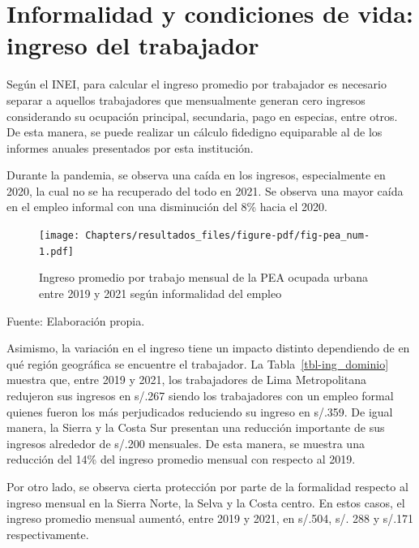 \documentclass[
  letterpaper,
  12pt,
  oneside,
  spanish,
  doublespacing,
  headsepline,
  parskip]{MastersDoctoralThesis}
\begin{document}
\hypertarget{informalidad-y-condiciones-de-vida-ingreso-del-trabajador}{%
\section{Informalidad y condiciones de vida: ingreso del
trabajador}\label{informalidad-y-condiciones-de-vida-ingreso-del-trabajador}}

Según el INEI, para calcular el ingreso promedio por trabajador es
necesario separar a aquellos trabajadores que mensualmente generan cero
ingresos considerando su ocupación principal, secundaria, pago en
especias, entre otros. De esta manera, se puede realizar un cálculo
fidedigno equiparable al de los informes anuales presentados por esta
institución.

Durante la pandemia, se observa una caída en los ingresos, especialmente
en 2020, la cual no se ha recuperado del todo en 2021. Se observa una
mayor caída en el empleo informal con una disminución del 8\% hacia el
2020.

\break

\begin{figure}

\caption{\label{fig-pea_num}Ingreso promedio por trabajo mensual de la
PEA ocupada urbana entre 2019 y 2021 según informalidad del empleo}

{\centering \texttt{[image: Chapters/resultados\_files/figure-pdf/fig-pea\_num-1.pdf]}

}

\end{figure}

\noindent \small Fuente: Elaboración propia. \normalsize

Asimismo, la variación en el ingreso tiene un impacto distinto
dependiendo de en qué región geográfica se encuentre el trabajador. La
Tabla~\ref{tbl-ing_dominio} muestra que, entre 2019 y 2021, los
trabajadores de Lima Metropolitana redujeron sus ingresos en s/.267
siendo los trabajadores con un empleo formal quienes fueron los más
perjudicados reduciendo su ingreso en s/.359. De igual manera, la Sierra
y la Costa Sur presentan una reducción importante de sus ingresos
alrededor de s/.200 mensuales. De esta manera, se muestra una reducción
del 14\% del ingreso promedio mensual con respecto al 2019.

Por otro lado, se observa cierta protección por parte de la formalidad
respecto al ingreso mensual en la Sierra Norte, la Selva y la Costa
centro. En estos casos, el ingreso promedio mensual aumentó, entre 2019
y 2021, en s/.504, s/. 288 y s/.171 respectivamente.
\end{document}
